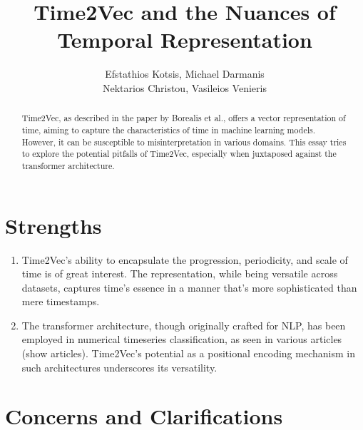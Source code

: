\documentclass{tufte-handout}
\title{Time2Vec and the Nuances of Temporal Representation}
\author{Efstathios Kotsis, Michael Darmanis\\ Nektarios Christou, Vasileios Venieris
}
\begin{document}
\maketitle%
\vspace{12pt}

\begin{abstract}
Time2Vec, as described in the paper by Borealis et al.\cite{time2vec}, offers a vector representation of time, aiming to capture the characteristics of time in machine learning models. However, it can be susceptible to misinterpretation in various domains. This essay tries to explore the potential pitfalls of Time2Vec, especially when juxtaposed against the transformer architecture.
\end{abstract}

\section{Strengths}

\begin{enumerate}
\item Time2Vec's ability to encapsulate the progression, periodicity, and scale of time is of great interest. The representation, while being versatile across datasets, captures time's essence in a manner that's more sophisticated than mere timestamps.

\item The transformer architecture, though originally crafted for NLP, has been employed in numerical timeseries classification, as seen in various articles (show articles). Time2Vec's potential as a positional encoding mechanism in such architectures underscores its versatility.
\end{enumerate}

\section{Concerns and Clarifications}
\end{document}
